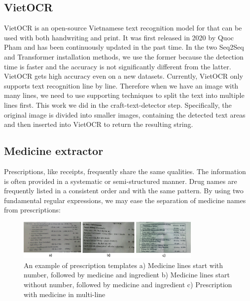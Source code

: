 \subsection{VietOCR}
VietOCR is an open-source Vietnamese text recognition model for that can be used with both handwriting and print. It was first released in 2020 by Quoc Pham and has been continuously updated in the past time. In the two Seq2Seq and Transformer installation methods, we use the former because the detection time is faster and the accuracy is not significantly different from the latter. VietOCR gets high accuracy even on a new datasets. Currently, VietOCR only supports text recognition line by line. Therefore when we have an image with many lines, we need to use supporting techniques to split the text into multiple lines first. This work we did in the craft-text-detector step. Specifically, the original image is divided into smaller images, containing the detected text areas and then inserted into VietOCR to return the resulting string.

\subsection{Medicine extractor}
Prescriptions, like receipts, frequently share the same qualities. The information is often provided in a systematic or semi-structured manner. Drug names are frequently listed in a consistent order and with the same pattern. By using two fundamental regular expressions, we may ease the separation of medicine names from prescriptions: 

\begin{figure}
\centering
\includegraphics[width=0.8\textwidth]{method/regex_1_crop.png}
\caption{An example of prescription templates a) Medicine lines start with number, followed by medicine and ingredient b) Medicine lines start without number, followed by medicine and ingredient c) Prescription with medicine in multi-line} \label{fig_regex_1}
\end{figure}

